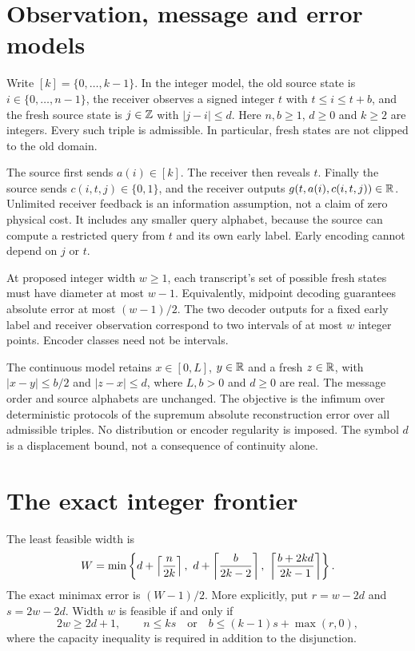 \section{Observation, message and error models}
Write $[k]=\{0,\ldots,k-1\}$. In the integer model, the old source state is $i\in\{0,\ldots,n-1\}$, the receiver observes a signed integer $t$ with $t\leq i\leq t+b$, and the fresh source state is $j\in\mathbb Z$ with $|j-i|\leq d$. Here $n,b\geq1$, $d\geq0$ and $k\geq2$ are integers. Every such triple is admissible. In particular, fresh states are not clipped to the old domain.

The source first sends $a(i)\in[k]$. The receiver then reveals $t$. Finally the source sends $c(i,t,j)\in\{0,1\}$, and the receiver outputs $g(t,a(i),c(i,t,j))\in\mathbb R$. Unlimited receiver feedback is an information assumption, not a claim of zero physical cost. It includes any smaller query alphabet, because the source can compute a restricted query from $t$ and its own early label. Early encoding cannot depend on $j$ or $t$.

At proposed integer width $w\geq1$, each transcript's set of possible fresh states must have diameter at most $w-1$. Equivalently, midpoint decoding guarantees absolute error at most $(w-1)/2$. The two decoder outputs for a fixed early label and receiver observation correspond to two intervals of at most $w$ integer points. Encoder classes need not be intervals.

The continuous model retains $x\in[0,L]$, $y\in\mathbb R$ and a fresh $z\in\mathbb R$, with $|x-y|\leq b/2$ and $|z-x|\leq d$, where $L,b>0$ and $d\geq0$ are real. The message order and source alphabets are unchanged. The objective is the infimum over deterministic protocols of the supremum absolute reconstruction error over all admissible triples. No distribution or encoder regularity is imposed. The symbol $d$ is a displacement bound, not a consequence of continuity alone.

\section{The exact integer frontier}
\begin{theorem}\label{B-thm:integer}
The least feasible width is
\begin{equation}\label{B-eq:W}
W=\min\left\{d+\ceil{\frac{n}{2k}},\ d+\ceil{\frac{b}{2k-2}},\ \ceil{\frac{b+2kd}{2k-1}}\right\}.
\end{equation}
The exact minimax error is $(W-1)/2$. More explicitly, put $r=w-2d$ and $s=2w-2d$. Width $w$ is feasible if and only if
\begin{equation}\label{B-eq:threshold}
2w\geq2d+1,\qquad n\leq ks\quad\text{or}\quad b\leq(k-1)s+\max(r,0),
\end{equation}
where the capacity inequality is required in addition to the disjunction.
\end{theorem}

